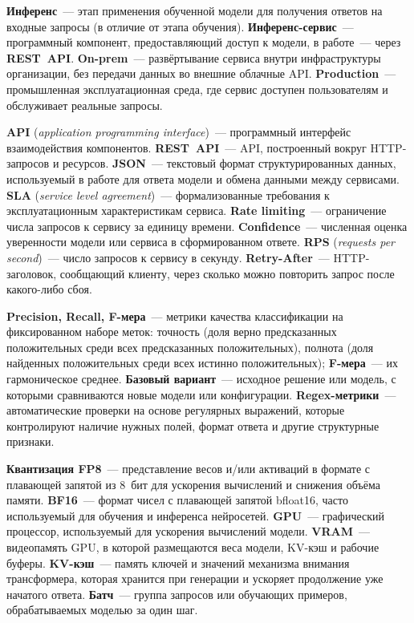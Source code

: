\documentclass[times]{itmo-student-thesis}
\begin{document}
\medskip\noindent\textbf{Инференс}~--- этап применения обученной модели для
получения ответов на входные запросы (в отличие от этапа обучения).
\textbf{Инференс-сервис}~--- программный компонент, предоставляющий доступ к модели,
в работе~--- через \textbf{REST~API}.
\textbf{On-prem}~--- развёртывание сервиса внутри инфраструктуры организации,
без передачи данных во внешние облачные API. \textbf{Production}~--- промышленная
эксплуатационная среда, где сервис доступен пользователям и обслуживает реальные
запросы.

\medskip\noindent\textbf{API} (\emph{application programming interface})~---
программный интерфейс взаимодействия компонентов. \textbf{REST~API}~--- API,
построенный вокруг HTTP-запросов и ресурсов. \textbf{JSON}~--- текстовый формат
структурированных данных, используемый в работе для ответа модели и обмена
данными между сервисами.
\textbf{SLA} (\emph{service level agreement})~--- формализованные требования
к эксплуатационным характеристикам сервиса.
\textbf{Rate limiting}~--- ограничение числа запросов к сервису за единицу
времени.
\textbf{Confidence}~--- численная оценка уверенности модели или сервиса в
сформированном ответе.
\textbf{RPS} (\emph{requests per second})~--- число запросов к сервису в секунду.
\textbf{Retry-After}~--- HTTP-заголовок, сообщающий клиенту, через сколько можно
повторить запрос после какого-либо сбоя.

\medskip\noindent\textbf{Precision, Recall, F-мера}~--- метрики качества классификации
на фиксированном наборе меток: точность (доля верно предсказанных положительных среди
всех предсказанных положительных), полнота (доля найденных положительных среди всех
истинно положительных); \textbf{F-мера}~--- их гармоническое среднее.
\textbf{Базовый вариант}~--- исходное решение или модель, с которыми сравниваются
новые модели или конфигурации. \textbf{Regex-метрики}~--- автоматические проверки
на основе регулярных выражений, которые контролируют наличие нужных полей,
формат ответа и другие структурные признаки.

\medskip\noindent\textbf{Квантизация FP8}~--- представление весов и/или активаций
в формате с плавающей запятой из 8~бит для ускорения вычислений и снижения объёма памяти.
\textbf{BF16}~--- формат чисел с плавающей запятой bfloat16, часто используемый
для обучения и инференса нейросетей. \textbf{GPU}~--- графический процессор,
используемый для ускорения вычислений модели. \textbf{VRAM}~--- видеопамять GPU,
в которой размещаются веса модели, KV-кэш и рабочие буферы.
\textbf{KV-кэш}~--- память ключей и значений механизма внимания трансформера,
которая хранится при генерации и ускоряет продолжение уже начатого ответа.
\textbf{Батч}~--- группа запросов или обучающих примеров, обрабатываемых моделью
за один шаг.
\end{document}
